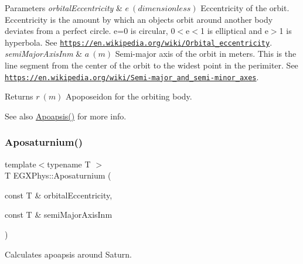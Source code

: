 \begin{DoxyParams}{Parameters}
{\em orbital\+Eccentricity} & $ e\ (dimensionless)$ Eccentricity of the orbit. Eccentricity is the amount by which an objects orbit around another body deviates from a perfect circle. e=0 is circular, 0$<$e$<$1 is elliptical and e$>$1 is hyperbola. See \href{https://en.wikipedia.org/wiki/Orbital_eccentricity}{\tt https\+://en.\+wikipedia.\+org/wiki/\+Orbital\+\_\+eccentricity}. \\
\hline
{\em semi\+Major\+Axis\+Inm} & $ a\ (m)$ Semi-\/major axis of the orbit in meters. This is the line segment from the center of the orbit to the widest point in the perimiter. See \href{https://en.wikipedia.org/wiki/Semi-major_and_semi-minor_axes}{\tt https\+://en.\+wikipedia.\+org/wiki/\+Semi-\/major\+\_\+and\+\_\+semi-\/minor\+\_\+axes}. \\
\hline
\end{DoxyParams}
\begin{DoxyReturn}{Returns}
$ r\ (m)$ Apoposeidon for the orbiting body. 
\end{DoxyReturn}
\begin{DoxySeeAlso}{See also}
\mbox{\hyperlink{group___e_g_x_phys-_apoapsis_gafd08a2d1d64886e7bb9bcb7ff65bc3ea}{Apoapsis()}} for more info. 
\end{DoxySeeAlso}
\mbox{\label{group___e_g_x_phys-_apoapsis_gabb69067baa611c8bda701d7040cc47b6}} 
\subsubsection{\texorpdfstring{Aposaturnium()}{Aposaturnium()}}
{\footnotesize\ttfamily template$<$typename T $>$ \\
T E\+G\+X\+Phys\+::\+Aposaturnium (\begin{DoxyParamCaption}\item[{const T \&}]{orbital\+Eccentricity,  }\item[{const T \&}]{semi\+Major\+Axis\+Inm }\end{DoxyParamCaption})}



Calculates apoapsis around Saturn. 


